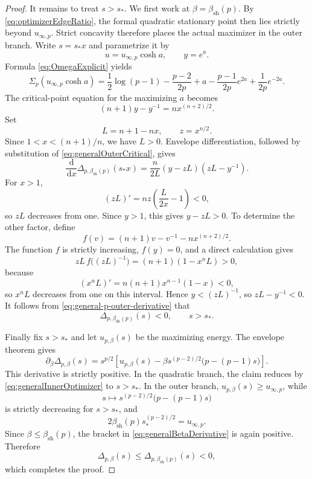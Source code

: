 \documentclass[11pt,reqno]{amsart}
\numberwithin{equation}{section}
\theoremstyle{plain}
\theoremstyle{definition}
\theoremstyle{remark}
\newcommand{\1}{\mathbf 1}
\newcommand{\dd}{\,\mathrm d}
\begin{document}
\begin{proof}
It remains to treat \(s>s_*\).  We first work at
\(\beta=\beta_{\mathrm{sh}}(p)\).  By
\eqref{eq:optimizerEdgeRatio}, the formal quadratic stationary point
then lies strictly beyond \(u_{\infty,p}\).  Strict concavity therefore
places the actual maximizer in the outer branch.  Write \(s=s_*x\) and
parametrize it by
\[
 u=u_{\infty,p}\cosh a,
 \qquad
 y=e^a.
\]
Formula \eqref{eq:OmegaExplicit} yields
\begin{equation}\label{eq:generalSigmaOutside}
 \Sigma_p(u_{\infty,p}\cosh a)
 =\frac12\log(p-1)-\frac{p-2}{2p}+a
  -\frac{p-1}{2p}e^{2a}+\frac1{2p}e^{-2a}.
\end{equation}
The critical-point equation for the maximizing \(a\) becomes
\begin{equation}\label{eq:generalOuterCritical}
 (n+1)y-y^{-1}=nx^{(n+2)/2}.
\end{equation}
Set
\[
 L=n+1-nx,
 \qquad
 z=x^{n/2}.
\]
Since \(1<x<(n+1)/n\), we have \(L>0\).  Envelope differentiation,
followed by substitution of \eqref{eq:generalOuterCritical}, gives
\begin{equation}\label{eq:general-p-outer-derivative}
 \frac{\dd}{\dd x}
 \Delta_{p,\beta_{\mathrm{sh}}(p)}(s_*x)
 =\frac{n}{2L}(y-zL)(zL-y^{-1}).
\end{equation}
For \(x>1\),
\[
 (zL)'=nz\left(\frac{L}{2x}-1\right)<0,
\]
so \(zL\) decreases from one.  Since \(y>1\), this gives
\(y-zL>0\).  To determine the other factor, define
\[
 f(v)=(n+1)v-v^{-1}-nx^{(n+2)/2}.
\]
The function \(f\) is strictly increasing, \(f(y)=0\), and a direct
calculation gives
\[
 zL\,f\bigl((zL)^{-1}\bigr)
 =(n+1)(1-x^nL)>0,
\]
because
\[
 (x^nL)'=n(n+1)x^{n-1}(1-x)<0,
\]
so \(x^nL\) decreases from one on this interval.  Hence
\(y<(zL)^{-1}\), so \(zL-y^{-1}<0\).  It follows from
\eqref{eq:general-p-outer-derivative} that
\[
 \Delta_{p,\beta_{\mathrm{sh}}(p)}(s)<0,
 \qquad s>s_*.
\]

Finally fix \(s>s_*\) and let \(u_{p,\beta}(s)\) be the maximizing
energy.  The envelope theorem gives
\begin{equation}\label{eq:generalBetaDerivative}
 \partial_\beta\Delta_{p,\beta}(s)
 =s^{p/2}\left[
  u_{p,\beta}(s)
  -\beta s^{(p-2)/2}\bigl(p-(p-1)s\bigr)
 \right].
\end{equation}
This derivative is strictly positive.  In the quadratic branch, the
claim reduces by \eqref{eq:generalInnerOptimizer} to \(s>s_*\).  In
the outer branch, \(u_{p,\beta}(s)\geq u_{\infty,p}\), while
\[
 s\longmapsto s^{(p-2)/2}\bigl(p-(p-1)s\bigr)
\]
is strictly decreasing for \(s>s_*\), and
\[
 2\beta_{\mathrm{sh}}(p)s_*^{(p-2)/2}=u_{\infty,p}.
\]
Since \(\beta\leq\beta_{\mathrm{sh}}(p)\), the bracket in
\eqref{eq:generalBetaDerivative} is again positive.  Therefore
\[
 \Delta_{p,\beta}(s)
 \leq\Delta_{p,\beta_{\mathrm{sh}}(p)}(s)<0,
\]
which completes the proof.
\end{proof}
\end{document}

